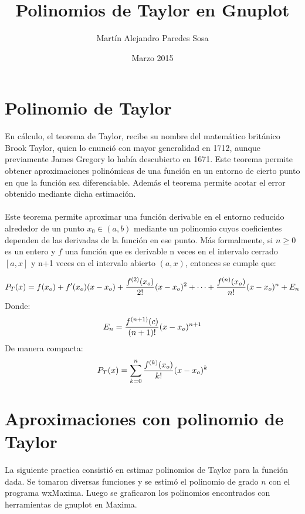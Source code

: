 \documentclass[12pt]{article}
\title{Polinomios de Taylor en Gnuplot}
\author{Martín Alejandro Paredes Sosa}
\date{Marzo 2015}
\begin{document}
\maketitle
\section{Polinomio de Taylor}
En cálculo, el teorema de Taylor, recibe su nombre del matemático británico Brook Taylor, quien lo enunció con mayor generalidad en 1712, aunque previamente James Gregory lo había descubierto en 1671. Este teorema permite obtener aproximaciones polinómicas de una función en un entorno de cierto punto en que la función sea diferenciable. Además el teorema permite acotar el error obtenido mediante dicha estimación. \\ \\
	Este teorema permite aproximar una función derivable en el entorno reducido alrededor de un punto $x_0 \in (a, b)$ mediante un polinomio cuyos coeficientes dependen de las derivadas de la función en ese punto. Más formalmente, si $ n \geq 0 $ es un entero y $ f $ una función que es derivable n veces en el intervalo cerrado $[a,x]$ y  n+1 veces en el intervalo abierto $(a,x)$, entonces se cumple que:

	$$ P_T(x)= f(x_o)+f'(x_o)(x-x_o)+ {f^{(2)}(x_o)\over 2!}(x-x_o)^2+\cdots+{f^{(n)}(x_o)\over n!}(x-x_o)^n+E_n $$
Donde:
	$$ E_n={f^{(n+1)}(c)\over (n+1)	!}(x-x_o)^{n+1} $$
De manera compacta:
	$$ P_T(x)=\sum^n_{k=0} {f^{(k)}(x_o)\over k!}(x-x_o)^k$$ 


\section{Aproximaciones con polinomio de Taylor}
La siguiente practica consistió en estimar polinomios de Taylor para la función dada. Se tomaron diversas funciones y se estimó el polinomio de grado $n$ con el programa wxMaxima. Luego se graficaron los polinomios encontrados con herramientas de gnuplot en Maxima.
\pagebreak
\end{document}
